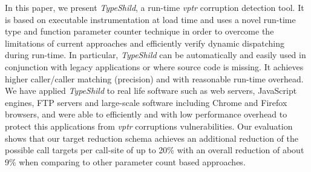 In this paper, we present \textit{TypeShild}, a run-time \textit{vptr} corruption
detection tool. It is based on executable instrumentation at load time
and uses a novel run-time type and function parameter counter technique
in order to overcome the limitations of current approaches and efficiently
verify dynamic dispatching during run-time.
In particular, \textit{TypeShild} can be automatically and easily used
in conjunction with legacy applications or where source code is missing.
It achieves higher caller/caller matching (precision) and with reasonable
run-time overhead.
We have applied \textit{TypeShild} to real life software such as
web servers, JavaScript engines, FTP servers and large-scale software
including Chrome and Firefox browsers, and were able to efficiently
and with low performance overhead to protect this applications from 
\textit{vptr} corruptions vulnerabilities.
Our evaluation shows that our target reduction schema achieves an additional
reduction of the possible call targets per call-site of up to 
20\% with an overall reduction of about 9\% when comparing to other
parameter count based approaches.

